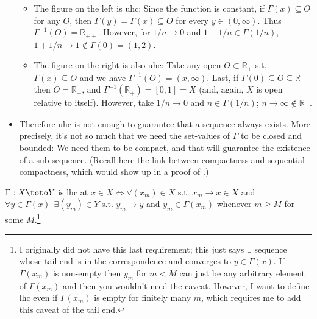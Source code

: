 \documentclass{article}
\begin{document}
\begin{itemize}[label=$\bullet$]
    \begin{itemize}[label=$\circ$]
      \item The figure on the left is uhc: Since the function is constant, if $\Gamma(x) \subseteq O$ for any $O$, then $\Gamma(y) = \Gamma(x) \subseteq O$ for every $y \in (0, \infty)$. Thus $\Gamma^{-1}(O) = \mathbb{R}_{++}$. However, for $1/n \to 0$ and $1 + 1/n \in \Gamma(1/n)$, $1 + 1/n \to 1 \notin \Gamma(0) = (1, 2)$.

      \item The figure on the right is also uhc: Take any open $O \subset \mathbb{R}_+$ s.t. $\Gamma(x) \subseteq O$ and we have $\Gamma^{-1}(O) = (x, \infty)$. Last, if $\Gamma(0) \subseteq O \subseteq \mathbb{R}$ then $O = \mathbb{R}_+$, and $\Gamma^{-1}(\mathbb{R}_+) = [0, 1] = X$  (and, again, $X$ is open relative to itself). However, take $1/n \to 0$ and $n \in \Gamma(1/n)$; $n \to \infty \notin \mathbb{R}_+$.
    \end{itemize}

  \item Therefore uhc is not enough to guarantee that a sequence always exists. More precisely, it's not so much that we need the set-values of $\Gamma$ to be closed and bounded: We need them to be compact, and that will guarantee the existence of a sub-sequence. (Recall here the link between compactness and sequential compactness, which would show up in a proof of .)
\end{itemize}

\begin{theorem}\label{thm:lecture3_compactness_lhc_sequential}
  $\Gamma: X \toto Y$ is lhc at $x \in X \iff \forall (x_m) \in X$ s.t. $x_m \to x \in X$ and $\forall y \in \Gamma(x) ~~ \exists (y_m) \in Y$ s.t. $y_m \to y$ and $y_m \in \Gamma(x_m)$ whenever $m \ge M$ for some $M$.\footnote{I originally did not have this last requirement; this just says $\exists$ sequence whose tail end is in the correspondence and converges to $y \in \Gamma(x)$. If $\Gamma(x_m)$ is non-empty then $y_m$ for $m < M$ can just be any arbitrary element of $\Gamma(x_m)$ and then you wouldn't need the caveat. However, I want to define lhc even if $\Gamma(x_m)$ is empty for finitely many $m$, which requires me to add this caveat of the tail end.}
\end{theorem}
\end{document}
